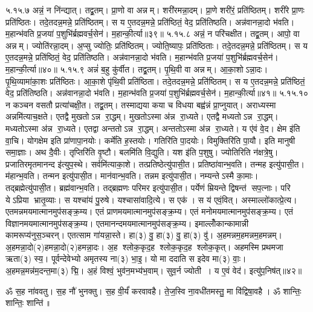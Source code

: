 ५.१५.७
अन्नं॒ न नि॑न्द्यात्। तद्व्र॒तम्। प्रा॒णो वा अन्नम्। शरी॑रमन्ना॒दम्। प्रा॒णे शरी॑रं॒ प्रति॑ष्ठितम्। शरी॑रे प्रा॒णः प्रति॑ष्ठितः। तदे॒तदन्न॒मन्ने॒ प्रति॑ष्ठितम्। स य ए॒तदन्न॒मन्ने॒ प्रति॑ष्ठितं॒ वेद॒ प्रति॑तिष्ठति। अन्न॑वानन्ना॒दो भ॑वति। म॒हान्भ॑वति प्र॒जया॑ प॒शुभि॑र्ब्रह्मवर्च॒सेन॑। म॒हान्की॒र्त्या॥३९॥
५.१५.८
अन्नं॒ न परि॑चक्षीत। तद्व्र॒तम्। आपो॒ वा अन्नम्। ज्योति॑रन्ना॒दम्। अ॒प्सु ज्योतिः॒ प्रति॑ष्ठितम्। ज्योति॒ष्यापः॒ प्रति॑ष्ठिताः। तदे॒तदन्न॒मन्ने॒ प्रति॑ष्ठितम्। स य ए॒तदन्न॒मन्ने॒ प्रति॑ष्ठितं॒ वेद॒ प्रति॑तिष्ठति। अन्न॑वानन्ना॒दो भ॑वति। म॒हान्भ॑वति प्र॒जया॑ प॒शुभि॑र्ब्रह्मवर्च॒सेन॑। म॒हान्की॒र्त्या॥४०॥
५.१५.९
अन्नं॑ ब॒हु कु॑र्वीत। तद्व्र॒तम्। पृ॒थि॒वी वा अन्नम्। आ॒का॒शोऽन्ना॒दः। पृ॒थि॒व्यामा॑का॒शः प्रति॑ष्ठितः। आ॒का॒शे पृ॑थि॒वी प्रति॑ष्ठिता। तदे॒तदन्न॒मन्ने॒ प्रति॑ष्ठितम्। स य ए॒तदन्न॒मन्ने॒ प्रति॑ष्ठितं॒ वेद॒ प्रति॑तिष्ठति। अन्न॑वानन्ना॒दो भ॑वति। म॒हान्भ॑वति प्र॒जया॑ प॒शुभि॑र्ब्रह्मवर्च॒सेन॑। म॒हान्की॒र्त्या॥४१॥
५.१५.१०
न कञ्चन वसतौ प्रत्या॑चक्षी॒त। तद्व्र॒तम्। तस्माद्यया कया च विधया बह्व॑न्नं प्रा॒प्नुयात्। अराध्यस्मा अन्नमि॑त्याच॒क्षते। एतद्वै मुखतोऽन्न रा॒द्धम्। मुखतोऽस्मा अ॑न्न रा॒ध्यते। एतद्वै मध्यतोऽन्न रा॒द्धम्। मध्यतोऽस्मा अ॑न्न रा॒ध्यते। एतद्वा अन्ततोऽन्न रा॒द्धम्। अन्ततोऽस्मा अ॑न्न रा॒ध्यते। य ए॑वं वे॒द। क्षेम इ॑ति वा॒चि। योगक्षेम इति प्रा॑णापा॒नयोः। कर्मे॑ति ह॒स्तयोः। गतिरि॑ति पा॒दयोः। विमुक्तिरि॑ति पा॒यौ। इति मानुषी समा॒ज्ञाः। अथ दै॒वीः। तृप्तिरि॑ति वृ॒ष्टौ। बलमि॑ति वि॒द्युति। यश इ॑ति प॒शुषु। ज्योतिरिति न॑क्षत्रे॒षु। प्रजातिरमृतमानन्द इ॑त्युप॒स्थे। सर्वमि॑त्याका॒शे। तत्प्रतिष्ठेत्यु॑पासी॒त। प्रतिष्ठा॑वान्भ॒वति। तन्मह इत्यु॑पासी॒त। म॑हान्भ॒वति। तन्मन इत्यु॑पासी॒त। मान॑वान्भ॒वति। तन्नम इत्यु॑पासी॒त। नम्यन्तेऽस्मै का॒माः। तद्ब्रह्मेत्यु॑पासी॒त। ब्रह्म॑वान्भ॒वति। तद्ब्रह्मणः परिमर इत्यु॑पासी॒त। पर्येणं म्रियन्ते द्विषन्त॑ सप॒त्नाः। परि येऽप्रिया भ्रातृ॒व्याः। स यश्चा॑यं पु॒रुषे। यश्चासा॑वादि॒त्ये। स एक॑। स य॑ एवं॒वित्। अस्माल्लो॑कात्प्रे॒त्य। एतमन्नमयमात्मानमुप॑सङ्क्र॒म्य। एतं प्राणमयमात्मानमुप॑सङ्क्र॒म्य। एतं मनोमयमात्मानमुप॑सङ्क्र॒म्य। एतं विज्ञानमयमात्मानमुप॑\-सङ्क्र॒म्य। एतमानन्दमयमात्मानमुप॑सङ्क्र॒म्य। इमाल्लोँकान्कामान्नी कामरूप्य॑नुस॒ञ्चरन्। एतत्साम गा॑यन्ना॒स्ते। हा(३) वु॒ हा(३) वु॒ हा(३) वु॑। अ॒हमन्नम॒हमन्नम॒हमन्नम्। अ॒हमन्ना॒दो(२)\-\aav{}हमन्ना॒दो(२)\aav{}हमन्ना॒दः। अ॒ह श्लोक॒कृद॒ह श्लोक॒कृद॒ह श्लोक॒कृत्। अहमस्मि प्रथमजा ऋता(३) स्य॒। पूर्वन्देवेभ्यो अमृतस्य ना(३) भा॒इ॒। यो मा ददाति स इदेव मा(३) वाः॒। अ॒हमन्न॒मन्न॑म॒दन्त॒मा(३) द्मि॒। अ॒हं  विश्वं॒ भुव॑न॒मभ्य॑भ॒वाम्। सुव॒र्न ज्योती। य ए॒वं वेद॑। इत्यु॑प॒निष॑त्॥४२॥

ॐ स॒ह ना॑ववतु। स॒ह नौ॑ भुनक्तु। स॒ह वी॒र्यं॑ करवावहै। ते॒ज॒स्वि ना॒वधी॑तमस्तु॒ मा वि॑द्विषा॒वहै। ॐ शान्तिः॒ शान्तिः॒ शान्ति॑॥

